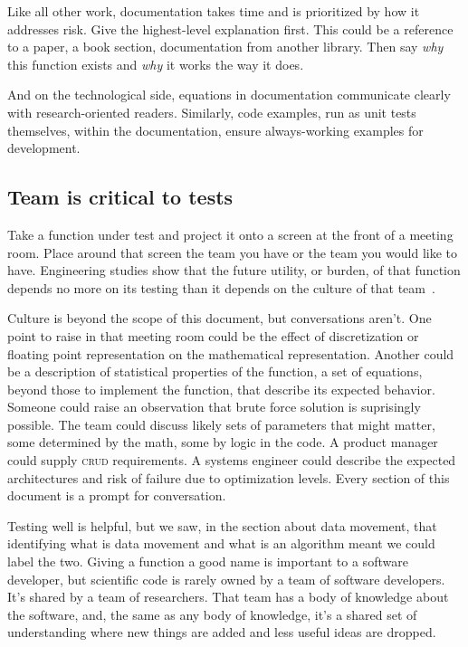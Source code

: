 \documentclass[fleqn,10pt]{olplainarticle}
\begin{document}
Like all other work, documentation takes time and is prioritized by
how it addresses risk. Give the highest-level explanation first.
This could be a reference to a paper, a book section, documentation from another library.
Then say \emph{why} this function exists and \emph{why} it works the
way it does.

And on the technological side, equations in documentation communicate
clearly with research-oriented readers. Similarly, code examples, run
as unit tests themselves, within the documentation, ensure always-working
examples for development.


\subsection{Team is critical to tests}

Take a function under test and project it onto a
screen at the front of a meeting room. Place around that screen
the team you have or the team you would like to have.
Engineering studies show that the future utility, or burden,
of that function depends no more on its testing than it
depends on the culture of that team~\citep{neumann2016,kanewala2014}.

Culture is beyond the scope of this document, but conversations
aren't. One point to raise in that meeting room could
be the effect of discretization or floating point representation
on the mathematical representation. Another could be a
description of statistical properties of the function, a set
of equations, beyond those to implement the function, that
describe its expected behavior. Someone could raise an observation
that brute force solution is suprisingly possible.
The team could discuss likely sets of parameters that might
matter, some determined by the math, some by logic in the
code. A product manager could supply \textsc{crud} requirements.
A systems engineer could describe the expected architectures
and risk of failure due to optimization levels. Every section
of this document is a prompt for conversation.

Testing well is helpful, but we saw, in the section about
data movement, that identifying what is data movement
and what is an algorithm meant we could label the two.
Giving a function a good name is important to a software
developer, but scientific code is rarely owned by a team
of software developers. It's shared by a team of researchers.
That team has a body of knowledge about the software, and,
the same as any body of knowledge, it's a shared set of
understanding where new things are added and less useful
ideas are dropped.
\end{document}

